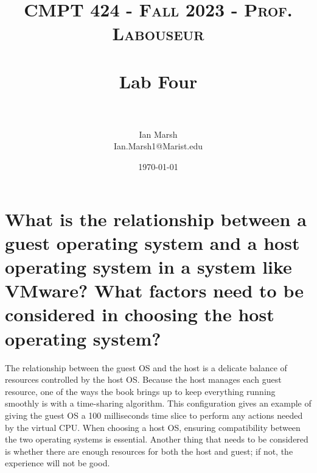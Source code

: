 \documentclass[10pt]{article}
\title{	
   \normalfont \normalsize 
   \textsc{CMPT 424 - Fall 2023 - Prof. Labouseur} \\[10pt] %
   \horrule{0.5pt} \\[0.25cm] 	%
   \huge Lab Four  \\     	    %
   \horrule{0.5pt} \\[0.25cm] 	%
}
\author{Ian Marsh \\ \normalsize Ian.Marsh1@Marist.edu}
\date{\normalsize\today} 	%
\begin{document}
\maketitle %

\maketitle

\section{What is the relationship between a guest operating system and a host operating
system in a system like VMware? What factors need to be considered in choosing the
host operating system?}
The relationship between the guest OS and the host is a delicate balance of resources controlled by the host OS. Because the host manages each guest resource, one of the ways the book brings up to keep everything running smoothly is with a time-sharing algorithm. This configuration gives an example of giving the guest OS a 100 milliseconds time slice to perform any actions needed by the virtual CPU. When choosing a host OS, ensuring compatibility between the two operating systems is essential. Another thing that needs to be considered is whether there are enough resources for both the host and guest; if not, the experience will not be good. 
\end{document}
